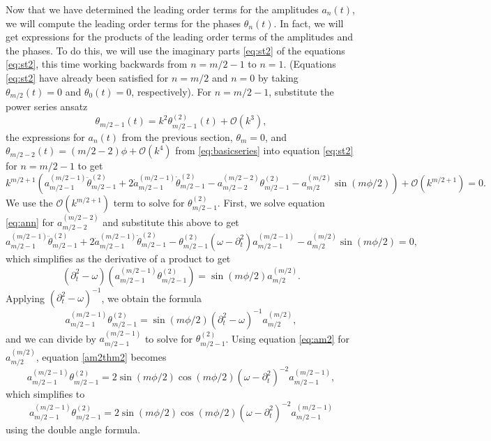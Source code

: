 \documentclass[11pt,reqno]{amsart}
\begin{document}
Now that we have determined the leading order terms for the amplitudes $a_n(t)$, we will compute the leading order terms for the phases $\theta_n(t)$. In fact, we will get expressions for the products of the leading order terms of the amplitudes and the phases. To do this, we will use the imaginary parts \cref{eq:st2} of the equations \cref{eq:st2}, this time working backwards from $n = m/2-1$ to $n=1$. (Equations \cref{eq:st2} have already been satisfied for $n=m/2$ and $n=0$ by taking $\theta_{m/2}(t) = 0$ and $\theta_0(t) = 0$, respectively). For $n=m/2-1$, substitute the power series ansatz
\[
\theta_{m/2-1}(t) = k^2 \theta_{m/2-1}^{(2)}(t) + \mathcal{O}(k^{3}),
\]
the expressions for $a_n(t)$ from the previous section, $\theta_m = 0$, and
$\theta_{m/2-2}(t) = (m/2-2)\phi + \mathcal{O}(k^4)$ from \cref{eq:basicseries} into equation \cref{eq:st2} for $n=m/2-1$ to get
\[
k^{m/2+1} \left( a_{m/2-1}^{({m/2-1})} \ddot\theta_{m/2-1}^{(2)} + 2 \dot a_{m/2-1}^{({m/2-1})} \dot \theta_{m/2-1}^{(2)} - a_{m/2-2}^{(m/2-2)} \theta_{m/2-1}^{(2)} - a_{m/2}^{(m/2)} \sin(m \phi/2) \right) + \mathcal{O}(k^{m/2+1}) = 0.
\]
We use the $\mathcal{O}(k^{m/2+1})$ term to solve for $\theta_{m/2-1}^{(2)}$. First, we solve equation \cref{eq:ann} for $a_{m/2-2}^{(m/2-2)}$ and substitute this above to get
\[
a_{m/2-1}^{({m/2-1})} \ddot\theta_{m/2-1}^{(2)} + 2 \dot a_{m/2-1}^{({m/2-1})} \dot \theta_{m/2-1}^{(2)} - \theta_{m/2-1}^{(2)} (\omega - \partial_t^2) a_{m/2-1}^{({m/2-1})} - a_{m/2}^{(m/2)} \sin(m \phi/2) = 0,
\]
which simplifies as the derivative of a product to get
\[
(\partial_t^2 - \omega)\left( a_{m/2-1}^{({m/2-1})} \theta_{m/2-1}^{(2)} \right) = \sin(m \phi/2) a_{m/2}^{(m/2)}.
\]
Applying $(\partial_t^2 - \omega)^{-1}$, we obtain the formula
\begin{equation}\label{am2thm2}
a_{m/2-1}^{({m/2-1})} \theta_{m/2-1}^{(2)} = \sin(m \phi/2) (\partial_t^2 - \omega)^{-1} a_{m/2}^{(m/2)},
\end{equation}
and we can divide by $a_{m/2-1}^{({m/2-1})}$ to solve for $\theta_{m/2-1}^{(2)}$. Using equation \cref{eq:am2} for $a_{m/2}^{(m/2)}$, equation \cref{am2thm2} becomes
\[
a_{m/2-1}^{({m/2-1})} \theta_{m/2-1}^{(2)} = 2 \sin(m \phi/2) \cos( m\phi/2) (\omega - \partial_t^2)^{-2} a_{m/2-1}^{(m/2-1)},
\]
which simplifies to 
\begin{equation}\label{am2thm2a}
a_{m/2-1}^{({m/2-1})} \theta_{m/2-1}^{(2)} = 2 \sin(m \phi/2) \cos( m\phi/2) (\omega - \partial_t^2)^{-2} a_{m/2-1}^{(m/2-1)}
\end{equation}
using the double angle formula.
\end{document}
